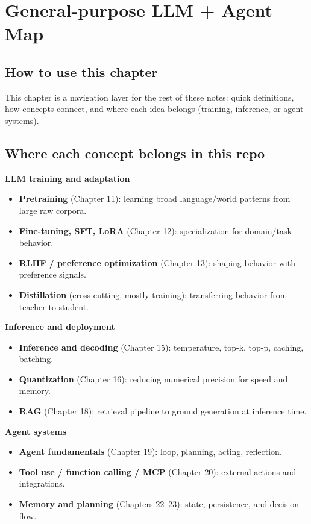 
\section{General-purpose LLM + Agent Map}

\subsection{How to use this chapter}

This chapter is a navigation layer for the rest of these notes: quick definitions, how concepts connect, and where each idea belongs (training, inference, or agent systems).

\subsection{Where each concept belongs in this repo}

\textbf{LLM training and adaptation}
\begin{itemize}[leftmargin=1.5em]
    \item \textbf{Pretraining} (Chapter 11): learning broad language/world patterns from large raw corpora.
    \item \textbf{Fine-tuning, SFT, LoRA} (Chapter 12): specialization for domain/task behavior.
    \item \textbf{RLHF / preference optimization} (Chapter 13): shaping behavior with preference signals.
    \item \textbf{Distillation} (cross-cutting, mostly training): transferring behavior from teacher to student.
\end{itemize}

\textbf{Inference and deployment}
\begin{itemize}[leftmargin=1.5em]
    \item \textbf{Inference and decoding} (Chapter 15): temperature, top-k, top-p, caching, batching.
    \item \textbf{Quantization} (Chapter 16): reducing numerical precision for speed and memory.
    \item \textbf{RAG} (Chapter 18): retrieval pipeline to ground generation at inference time.
\end{itemize}

\textbf{Agent systems}
\begin{itemize}[leftmargin=1.5em]
    \item \textbf{Agent fundamentals} (Chapter 19): loop, planning, acting, reflection.
    \item \textbf{Tool use / function calling / MCP} (Chapter 20): external actions and integrations.
    \item \textbf{Memory and planning} (Chapters 22--23): state, persistence, and decision flow.
\end{itemize}

